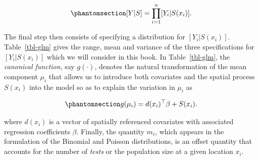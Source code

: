 \documentclass[
  letterpaper,
]{krantz}
\begin{document}
\begin{equation}\phantomsection\label{eq-glm-ch1}{
[Y | S] = \prod_{i=1}^n [Y_i | S(x_i)].
}\end{equation}

The final step then consists of specifying a distribution for
\([Y_i | S(x_i)]\). Table~\ref{tbl-glm} gives the range, mean and
variance of the three specifications for \([Y_i | S(x_i)]\) which we
will consider in this book. In Table~\ref{tbl-glm}, the \emph{canonical
function}, say \(g(\cdot)\), denotes the natural transformation of the
mean component \(\mu_i\) that allows us to introduce both covariates and
the spatial process \(S(x_i)\) into the model so as to explain the
variation in \(\mu_i\) as

\begin{equation}\phantomsection\label{eq-linear-predictor-ch1}{
g(\mu_i) = d(x_i)^\top \beta + S(x_i).
}\end{equation}

where \(d(x_i)\) is a vector of spatially referenced covariates with
associated regression coefficients \(\beta\). Finally, the quantity
\(m_i\), which appears in the formulation of the Binomial and Poisson
distributions, is an offset quantity that accounts for the number of
\emph{tests} or the population size at a given location \(x_i\).
\end{document}

